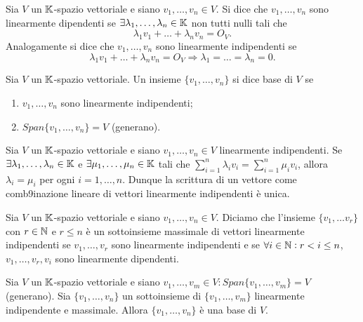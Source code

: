 \begin{definition} 
	Sia $ V $ un $ \mathbb{K} $-spazio vettoriale e siano $ v_1, \ldots , v_n \in V $. Si dice che $ v_1, \ldots, v_n $ sono linearmente dipendenti se $ \exists \lambda_1, \ldots , \lambda_n \in \mathbb{K} $ non tutti nulli tali che \[\lambda_1 v_1 + \ldots + \lambda_n v_n = O_V.\] Analogamente si dice che $ v_1, \ldots, v_n $ sono linearmente indipendenti se \[\lambda_1 v_1 + \ldots + \lambda_n v_n = O_V \Rightarrow \lambda_1 = \ldots = \lambda_n = 0.\]	
\end{definition}

\begin{definition}[base]
	Sia $ V $ un $ \mathbb{K} $-spazio vettoriale. Un insieme $ \{v_1, \ldots, v_n\} $ si dice base di $ V $ se
	\begin{enumerate}[label=(\roman*)]
		\item $ v_1, \ldots, v_n $ sono linearmente indipendenti;
		\item $ Span\{v_1, \ldots , v_n\} = V $ (generano).
	\end{enumerate}
\end{definition}

\begin{thm}
	Sia $ V $ un $ \mathbb{K} $-spazio vettoriale e siano $ v_1, \ldots , v_n \in V $ linearmente indipendenti. Se $ \exists \lambda_1, \ldots, \lambda_n \in \mathbb{K} $ e $ \exists \mu_1, \ldots, \mu_n \in \mathbb{K} $ tali che $ \sum_{i = 1}^{n} \lambda_i v_i = \sum_{i = 1}^{n} \mu_i v_i $, allora $ \lambda_i = \mu_i $ per ogni $ i = 1, \ldots, n $. Dunque la scrittura di un vettore come comb9inazione lineare di vettori linearmente indipendenti è unica.
\end{thm}

\begin{definition}
	Sia $ V $ un $ \mathbb{K} $-spazio vettoriale e siano $ v_1, \ldots , v_n \in V $. Diciamo che l'insieme $ \{v_1, \ldots v_r\} $ con $ r \in \mathbb{N} $ e $ r \leq n $ è un sottoinsieme massimale di vettori linearmente indipendenti se $ v_1, \ldots, v_r $ sono linearmente indipendenti e se $ \forall i \in \mathbb{N} : r < i \leq n $, $ v_1, \ldots, v_r, v_i $ sono linearmente dipendenti. 
\end{definition}

\begin{thm}
	Sia $ V $ un $ \mathbb{K} $-spazio vettoriale e siano $ v_1, \ldots , v_m \in V : Span{\{v_1, \ldots, v_m\}} = V $ (generano). Sia $ \{v_1, \ldots, v_n\} $ un sottoinsieme di $ \{v_1, \ldots, v_m\} $ linearmente indipendente e massimale. Allora $ \{v_1, \ldots, v_n\} $ è una base di $ V $. 
\end{thm}

